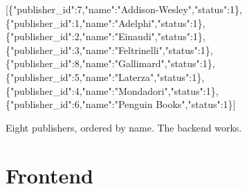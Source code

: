 \documentclass[11pt,a4paper,oneside]{book}
\newenvironment{Shaded}{\begin{snugshade}}{\end{snugshade}}
\newcommand{\DataTypeTok}[1]{\textcolor[HTML]{902000}{#1}}
\newcommand{\DecValTok}[1]{\textcolor[HTML]{40A070}{#1}}
\newcommand{\StringTok}[1]{\textcolor[HTML]{4070A0}{#1}}
\newcommand{\OtherTok}[1]{\textcolor[HTML]{007020}{#1}}
\newcommand{\FunctionTok}[1]{\textcolor[HTML]{06287E}{#1}}
\begin{document}
\begin{Shaded}
\begin{Highlighting}[]
\OtherTok{[}\FunctionTok{\{}\DataTypeTok{"publisher\_id"}\FunctionTok{:}\DecValTok{7}\FunctionTok{,}\DataTypeTok{"name"}\FunctionTok{:}\StringTok{"Addison{-}Wesley"}\FunctionTok{,}\DataTypeTok{"status"}\FunctionTok{:}\DecValTok{1}\FunctionTok{\}}\OtherTok{,}
 \FunctionTok{\{}\DataTypeTok{"publisher\_id"}\FunctionTok{:}\DecValTok{1}\FunctionTok{,}\DataTypeTok{"name"}\FunctionTok{:}\StringTok{"Adelphi"}\FunctionTok{,}\DataTypeTok{"status"}\FunctionTok{:}\DecValTok{1}\FunctionTok{\}}\OtherTok{,}
 \FunctionTok{\{}\DataTypeTok{"publisher\_id"}\FunctionTok{:}\DecValTok{2}\FunctionTok{,}\DataTypeTok{"name"}\FunctionTok{:}\StringTok{"Einaudi"}\FunctionTok{,}\DataTypeTok{"status"}\FunctionTok{:}\DecValTok{1}\FunctionTok{\}}\OtherTok{,}
 \FunctionTok{\{}\DataTypeTok{"publisher\_id"}\FunctionTok{:}\DecValTok{3}\FunctionTok{,}\DataTypeTok{"name"}\FunctionTok{:}\StringTok{"Feltrinelli"}\FunctionTok{,}\DataTypeTok{"status"}\FunctionTok{:}\DecValTok{1}\FunctionTok{\}}\OtherTok{,}
 \FunctionTok{\{}\DataTypeTok{"publisher\_id"}\FunctionTok{:}\DecValTok{8}\FunctionTok{,}\DataTypeTok{"name"}\FunctionTok{:}\StringTok{"Gallimard"}\FunctionTok{,}\DataTypeTok{"status"}\FunctionTok{:}\DecValTok{1}\FunctionTok{\}}\OtherTok{,}
 \FunctionTok{\{}\DataTypeTok{"publisher\_id"}\FunctionTok{:}\DecValTok{5}\FunctionTok{,}\DataTypeTok{"name"}\FunctionTok{:}\StringTok{"Laterza"}\FunctionTok{,}\DataTypeTok{"status"}\FunctionTok{:}\DecValTok{1}\FunctionTok{\}}\OtherTok{,}
 \FunctionTok{\{}\DataTypeTok{"publisher\_id"}\FunctionTok{:}\DecValTok{4}\FunctionTok{,}\DataTypeTok{"name"}\FunctionTok{:}\StringTok{"Mondadori"}\FunctionTok{,}\DataTypeTok{"status"}\FunctionTok{:}\DecValTok{1}\FunctionTok{\}}\OtherTok{,}
 \FunctionTok{\{}\DataTypeTok{"publisher\_id"}\FunctionTok{:}\DecValTok{6}\FunctionTok{,}\DataTypeTok{"name"}\FunctionTok{:}\StringTok{"Penguin Books"}\FunctionTok{,}\DataTypeTok{"status"}\FunctionTok{:}\DecValTok{1}\FunctionTok{\}}\OtherTok{]}
\end{Highlighting}
\end{Shaded}

Eight publishers, ordered by name. The backend works.

\newpage

\hypertarget{frontend}{%
\chapter{Frontend}\label{frontend}}
\end{document}
